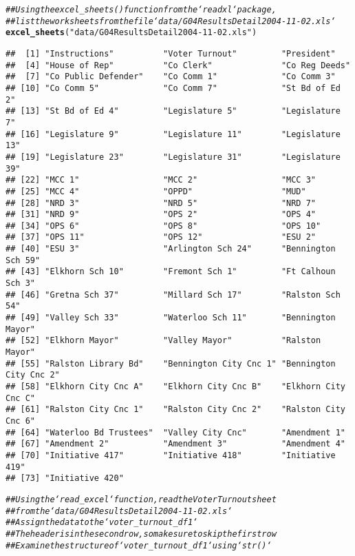 \documentclass{article}\usepackage[]{graphicx}\usepackage[]{xcolor}
\makeatletter
\newcommand{\hlstr}[1]{\textcolor[rgb]{0.192,0.494,0.8}{#1}}%
\newcommand{\hlcom}[1]{\textcolor[rgb]{0.678,0.584,0.686}{\textit{#1}}}%
\newcommand{\hlstd}[1]{\textcolor[rgb]{0.345,0.345,0.345}{#1}}%
\newcommand{\hlkwd}[1]{\textcolor[rgb]{0.737,0.353,0.396}{\textbf{#1}}}%
\newenvironment{kframe}{%
 \def\at@end@of@kframe{}%
 \ifinner\ifhmode%
  \def\at@end@of@kframe{\end{minipage}}%
  \begin{minipage}{\columnwidth}%
 \fi\fi%
 \def\FrameCommand##1{\hskip\@totalleftmargin \hskip-\fboxsep
 \colorbox{shadecolor}{##1}\hskip-\fboxsep
     \hskip-\linewidth \hskip-\@totalleftmargin \hskip\columnwidth}%
 \MakeFramed {\advance\hsize-\width
   \@totalleftmargin\z@ \linewidth\hsize
   \@setminipage}}%
 {\par\unskip\endMakeFramed%
 \at@end@of@kframe}
\newenvironment{knitrout}{}{} %
\makeatother
\begin{document}
\begin{knitrout}
\begin{kframe}
\begin{alltt}
\hlcom{## Using the excel_sheets() function from the `readxl` package,}
\hlcom{## list the worksheets from the file `data/G04ResultsDetail2004-11-02.xls`}
\hlkwd{excel_sheets}\hlstd{(}\hlstr{"data/G04ResultsDetail2004-11-02.xls"}\hlstd{)}
\end{alltt}
\begin{verbatim}
##  [1] "Instructions"          "Voter Turnout"         "President"            
##  [4] "House of Rep"          "Co Clerk"              "Co Reg Deeds"         
##  [7] "Co Public Defender"    "Co Comm 1"             "Co Comm 3"            
## [10] "Co Comm 5"             "Co Comm 7"             "St Bd of Ed 2"        
## [13] "St Bd of Ed 4"         "Legislature 5"         "Legislature 7"        
## [16] "Legislature 9"         "Legislature 11"        "Legislature 13"       
## [19] "Legislature 23"        "Legislature 31"        "Legislature 39"       
## [22] "MCC 1"                 "MCC 2"                 "MCC 3"                
## [25] "MCC 4"                 "OPPD"                  "MUD"                  
## [28] "NRD 3"                 "NRD 5"                 "NRD 7"                
## [31] "NRD 9"                 "OPS 2"                 "OPS 4"                
## [34] "OPS 6"                 "OPS 8"                 "OPS 10"               
## [37] "OPS 11"                "OPS 12"                "ESU 2"                
## [40] "ESU 3"                 "Arlington Sch 24"      "Bennington Sch 59"    
## [43] "Elkhorn Sch 10"        "Fremont Sch 1"         "Ft Calhoun Sch 3"     
## [46] "Gretna Sch 37"         "Millard Sch 17"        "Ralston Sch 54"       
## [49] "Valley Sch 33"         "Waterloo Sch 11"       "Bennington Mayor"     
## [52] "Elkhorn Mayor"         "Valley Mayor"          "Ralston Mayor"        
## [55] "Ralston Library Bd"    "Bennington City Cnc 1" "Bennington City Cnc 2"
## [58] "Elkhorn City Cnc A"    "Elkhorn City Cnc B"    "Elkhorn City Cnc C"   
## [61] "Ralston City Cnc 1"    "Ralston City Cnc 2"    "Ralston City Cnc 6"   
## [64] "Waterloo Bd Trustees"  "Valley City Cnc"       "Amendment 1"          
## [67] "Amendment 2"           "Amendment 3"           "Amendment 4"          
## [70] "Initiative 417"        "Initiative 418"        "Initiative 419"       
## [73] "Initiative 420"
\end{verbatim}
\begin{alltt}
\hlcom{## Using the `read_excel` function, read the Voter Turnout sheet}
\hlcom{## from the `data/G04ResultsDetail2004-11-02.xls`}
\hlcom{## Assign the data to the `voter_turnout_df1`}
\hlcom{## The header is in the second row, so make sure to skip the first row}
\hlcom{## Examine the structure of `voter_turnout_df1` using `str()`}


\end{alltt}
\end{kframe}
\end{knitrout}
\end{document}
